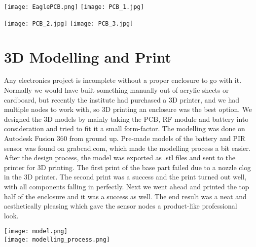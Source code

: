 \begin{center}
	\texttt{[image: EaglePCB.png]}
	\texttt{[image: PCB\_1.jpg]}
	
	\texttt{[image: PCB\_2.jpg]}
	\texttt{[image: PCB\_3.jpg]}
\end{center}


\section{3D Modelling and Print}
Any electronics project is incomplete without a proper enclosure to go with it. Normally we would have built something manually out of acrylic sheets or cardboard, but recently the institute had purchased a 3D printer, and we had multiple nodes to work with, so 3D printing an enclosure was the best option. 
We designed the 3D models by mainly taking the PCB, RF module and battery into consideration and tried to fit it a small form-factor. The modelling was done on Autodesk Fusion 360 from ground up. Pre-made models of the battery and PIR sensor was found on grabcad.com, which made the modelling process a bit easier.
After the design process, the model was exported as .stl files and sent to the printer for 3D printing. The first print of the base part failed due to a nozzle clog in the 3D printer. The second print was a success and the print turned out well, with all components falling in perfectly. Next we went ahead and printed the top half of the enclosure and it was a success as well.
The end result was a neat and aesthetically pleasing which gave the sensor nodes a product-like professional look.

\begin{center}
	\texttt{[image: model.png]}
	\\
	\texttt{[image: modelling\_process.png]}
\end{center}


